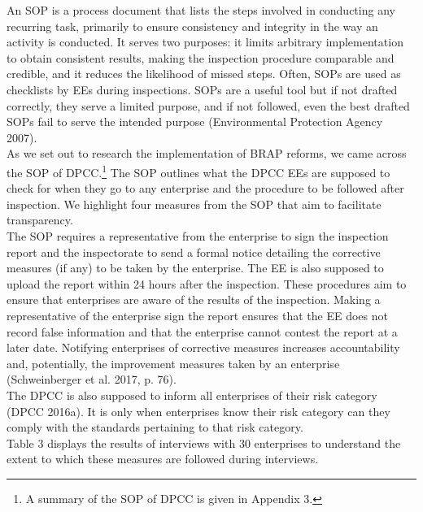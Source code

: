 \documentclass[a4paper, 12pt]{article}
\begin{document}
	An SOP is a process document that lists the steps involved in conducting any recurring task, primarily to ensure consistency and integrity in the way an activity is conducted. It serves two purposes: it limits arbitrary implementation to obtain consistent results, making the inspection procedure comparable and credible, and it reduces the likelihood of missed steps. Often, SOPs are used as checklists by EEs during inspections. SOPs are a useful tool but if not drafted correctly, they serve a limited purpose, and if not followed, even the best drafted SOPs fail to serve the intended purpose (Environmental Protection Agency 2007). \\
	
	As we set out to research the implementation of BRAP reforms, we came across the SOP of DPCC.\footnote{A summary of the SOP of DPCC is given in Appendix 3.} The SOP outlines what the DPCC EEs are supposed to check for when they go to any enterprise and the procedure to be followed after inspection. We highlight four measures from the SOP that aim to facilitate transparency. \\
	
	The SOP requires a representative from the enterprise to sign the inspection report and the inspectorate to send a formal notice detailing the corrective measures (if any) to be taken by the enterprise. The EE is also supposed to upload the report within 24 hours after the inspection. These procedures aim to ensure that enterprises are aware of the results of the inspection. Making a representative of the enterprise sign the report ensures that the EE does not record false information and that the enterprise cannot contest the report at a later date. Notifying enterprises of corrective measures increases accountability and, potentially, the improvement measures taken by an enterprise (Schweinberger et al. 2017, p. 76). \\
	
	The DPCC is also supposed to inform all enterprises of their risk category (DPCC 2016a). It is only when enterprises know their risk category can they comply with the standards pertaining to that risk category. \\
	
	Table 3 displays the results of interviews with 30 enterprises to understand the extent to which these measures are followed during interviews.

	
\end{document}
